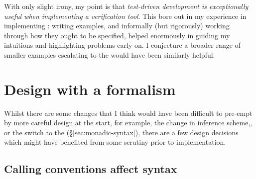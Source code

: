 
With only slight irony, my point is that \emph{test-driven development is
exceptionally useful when implementing a verification tool}. This bore out in
my experience in implementing : writing examples, and informally (but
rigorously) working through how they ought to be specified, helped enormously
in guiding my intuitions and highlighting problems early on. I conjecture a
broader range of smaller examples escalating to the  would
have been similarly helpful.

\section{Design with a formalism}

Whilst there are some changes that I think would have been difficult to
pre-empt by more careful design at the start, for example, the change in
inference
scheme,, or the switch to the 
(\S\ref{sec:monadic-syntax}), there are a few design decisions which might
have benefited from some scrutiny prior to implementation.

\subsection{Calling conventions affect syntax}

%
%

